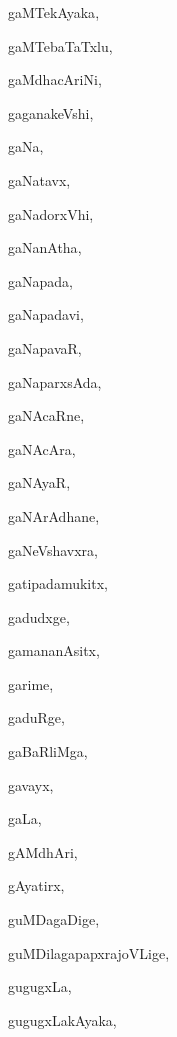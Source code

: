\begin{multicols}{3}
{\noindent
{gaMTekAyaka}, \pageref{gaMTekAyaka}

\noindent
{gaMTebaTaTxlu}, \pageref{gaMTebaTaTxlu}

\noindent
{gaMdhacAriNi}, \pageref{gaMdhacAriNi}

\noindent
{gaganakeVshi}, \pageref{gaganakeVshi}

\noindent
{gaNa}, \pageref{gaNa}

\noindent
{gaNatavx}, \pageref{gaNatavx}

\noindent
{gaNadorxVhi}, \pageref{gaNadorxVhi}

\noindent
{gaNanAtha}, \pageref{gaNanAtha}

\noindent
{gaNapada}, \pageref{gaNapada}

\noindent
{gaNapadavi}, \pageref{gaNapadavi}

\noindent
{gaNapavaR}, \pageref{gaNapavaR}

\noindent
{gaNaparxsAda}, \pageref{gaNaparxsAda}

\noindent
{gaNAcaRne}, \pageref{gaNAcaRne}

\noindent
{gaNAcAra}, \pageref{gaNAcAra}

\noindent
{gaNAyaR}, \pageref{gaNAyaR}

\noindent
{gaNArAdhane}, \pageref{gaNArAdhane}

\noindent
{gaNeVshavxra}, \pageref{gaNeVshavxra}

\noindent
{gatipadamukitx}, \pageref{gatipadamukitx}

\noindent
{gadudxge}, \pageref{gadudxge}

\noindent
{gamananAsitx}, \pageref{gamananAsitx}

\noindent
{garime}, \pageref{garime}

\noindent
{gaduRge}, \pageref{gaduRge}

\noindent
{gaBaRliMga}, \pageref{gaBaRliMga}

\noindent
{gavayx}, \pageref{gavayx}

\noindent
{gaLa}, \pageref{gaLa}

\noindent
{gAMdhAri}, \pageref{gAMdhAri}

\noindent
{gAyatirx}, \pageref{gAyatirx}

\noindent
{guMDagaDige}, \pageref{guMDagaDige}

\noindent
{guMDilagapapxrajoVLige}, \pageref{guMDilagapapxrajoVLige}

\noindent
{gugugxLa}, \pageref{gugugxLa}

\noindent
{gugugxLakAyaka}, \pageref{gugugxLakAyaka}

}
\end{multicols}

